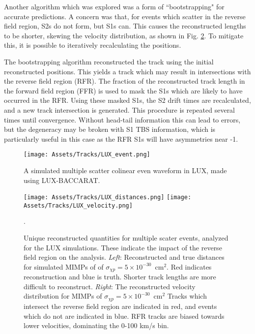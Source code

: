 Another algorithm which was explored was a form of ``bootstrapping" for accurate predictions.
A concern was that, for events which scatter in the reverse field region, S2s do not form, but S1s can.
This causes the reconstructed lengths to be shorter, skewing the velocity distribution, as shown in Fig. \ref{fig:lux_vel}.
To mitigate this, it is possible to  iteratively recalculating the positions.

The bootstrapping algorithm reconstructed the track using the initial reconstructed positions.
This yields a track which may result in intersections with the reverse field region (RFR).
The fraction of the reconstructed track length in the forward field region (FFR) is used to mask the S1s which are likely to have occurred in the RFR.
Using these masked S1s, the S2 drift times are recalculated, and a new track intersection is generated.
This procedure is repeated several times until convergence.
Without head-tail information this can lead to errors, but the degeneracy may be broken with S1 TBS information, which is particularly useful in this case as the RFR S1s will have asymmetries near -1.

\begin{figure}
    \centering
    \texttt{[image: Assets/Tracks/LUX\_event.png]}
    \caption{A simulated multiple scatter colinear even waveform in LUX, made using LUX-BACCARAT.}
    \label{fig:lux_mimp}
\end{figure}

\begin{figure}
    \centering
    \texttt{[image: Assets/Tracks/LUX\_distances.png]}
    \texttt{[image: Assets/Tracks/LUX\_velocity.png]}
    \caption[ Unique reconstructed quantities for multiple scater events, analyzed for the LUX simulations. ]%
    {
    Unique reconstructed quantities for multiple scater events, analyzed for the LUX simulations. These indicate the impact of the reverse field region on the analysis.
    \textit{Left}: Reconstructed and true distances for simulated MIMPs of of $\sigma_{\chi p} = 5\times 10^{-30}$~cm$^2$.
    Red indicates reconstruction and blue is truth.
    Shorter track lengths are more difficult to reconstruct.
    \textit{Right}:
    The reconstructed velocity distribution for MIMPs of $\sigma_{\chi p} = 5\times 10^{-30}$~cm$^2$
    Tracks which intersect the reverse field region are indicated in red, and events which do not are indicated in blue.
    RFR tracks are biased towards lower velocities, dominating the 0-100 km/s bin.}.
    \label{fig:lux_vel}
\end{figure}
\afterpage{\FloatBarrier}
